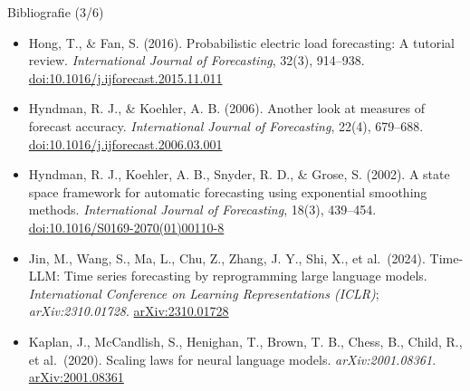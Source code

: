 \begin{frame}{Bibliografie (3/6)}
\begin{itemize}
    \item Hong, T., \& Fan, S. (2016). Probabilistic electric load forecasting: A tutorial review. \textit{International Journal of Forecasting}, 32(3), 914--938. \href{https://doi.org/10.1016/j.ijforecast.2015.11.011}{doi:10.1016/j.ijforecast.2015.11.011}
    \item Hyndman, R. J., \& Koehler, A. B. (2006). Another look at measures of forecast accuracy. \textit{International Journal of Forecasting}, 22(4), 679--688. \href{https://doi.org/10.1016/j.ijforecast.2006.03.001}{doi:10.1016/j.ijforecast.2006.03.001}
    \item Hyndman, R. J., Koehler, A. B., Snyder, R. D., \& Grose, S. (2002). A state space framework for automatic forecasting using exponential smoothing methods. \textit{International Journal of Forecasting}, 18(3), 439--454. \href{https://doi.org/10.1016/S0169-2070(01)00110-8}{doi:10.1016/S0169-2070(01)00110-8}
    \item Jin, M., Wang, S., Ma, L., Chu, Z., Zhang, J. Y., Shi, X., et al.\ (2024). Time-LLM: Time series forecasting by reprogramming large language models. \textit{International Conference on Learning Representations (ICLR)}; \textit{arXiv:2310.01728}. \href{https://arxiv.org/abs/2310.01728}{arXiv:2310.01728}
    \item Kaplan, J., McCandlish, S., Henighan, T., Brown, T. B., Chess, B., Child, R., et al.\ (2020). Scaling laws for neural language models. \textit{arXiv:2001.08361}. \href{https://arxiv.org/abs/2001.08361}{arXiv:2001.08361}
\end{itemize}
\end{frame}

